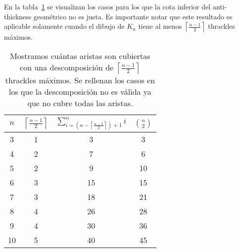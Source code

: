 En la tabla~\ref{table:attrivialtight} se visualizan los casos para los que la cota
inferior del anti-thickness geométrico no es justa. Es importante
notar que este resultado es aplicable solamente cuando el dibujo de $K_n$ tiene al menos
$\left\lceil\frac{n-1}{2}\right\rceil$ thrackles máximos.

\begin{table}[t]
  \centering
  \begin{tabular}{|c|c|c|c|}
    \hline
    $n$ & $\left\lceil\frac{n-1}{2}\right\rceil$ & $\sum^n_{i=\left(n-\left\lceil\frac{n-1}{2}\right\rceil\right) + 1}i$ & $\binom{n}{2}$\\[5pt] \hline\hline
    3   & 1  & 3 & 3 \\ \hline
    4   & 2  & 7 & 6 \\ \hline
    5   & 2  & \cellcolor{red!25}9 & 10 \\ \hline
    6   & 3  & 15 & 15 \\ \hline
    7   & 3  & \cellcolor{red!25}18 & 21 \\ \hline
    8   & 4  & \cellcolor{red!25}26 & 28 \\ \hline
    9   & 4  & \cellcolor{red!25}30 & 36 \\ \hline
    10  & 5  & \cellcolor{red!25}40 & 45 \\ \hline
  \end{tabular}
  \caption{ Mostramos cuántas aristas son cubiertas con una descomposición de $\left\lceil\frac{n-1}{2}\right\rceil$  thrackles
  máximos. Se rellenan los casos en los que la descomposición no es válida ya que no cubre todas las aristas. }
  \label{table:attrivialtight}
\end{table}
%
%




